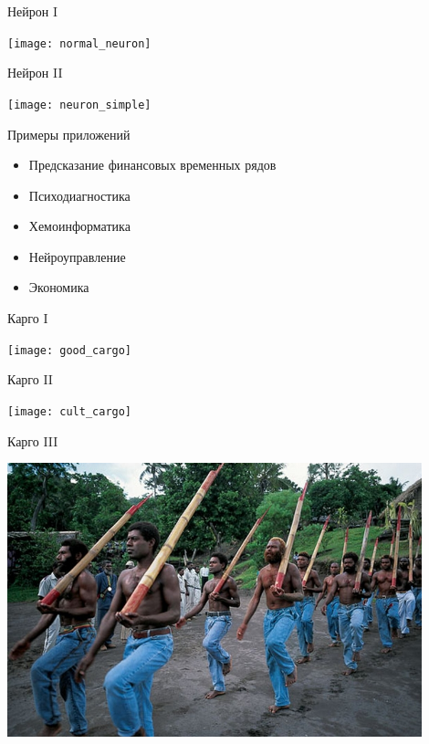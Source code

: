 \documentclass[14pt, fleqn, xcolor={dvipsnames, table}]{beamer}
\begin{document}
\begin{frame}{Нейрон I}
\begin{center}
\texttt{[image: normal\_neuron]}
\end{center}
\end{frame}

\begin{frame}{Нейрон II}
\begin{center}
\texttt{[image: neuron\_simple]}
\end{center}
\end{frame}

\begin{frame}{Примеры приложений}
\begin{itemize}
  \item Предсказание финансовых временных рядов
  \item Психодиагностика
  \item Хемоинформатика
  \item Нейроуправление
  \item Экономика
\end{itemize}
\end{frame}

\begin{frame}{Карго I}
\begin{center}
\texttt{[image: good\_cargo]}
\end{center}
\end{frame}


\begin{frame}{Карго II}
\begin{center}
\texttt{[image: cult\_cargo]}
\end{center}
\end{frame}

\begin{frame}{Карго III}
\begin{center}
\includegraphics[width=0.9\textwidth]{cargo_2}
\end{center}
\end{frame}
\end{document}
